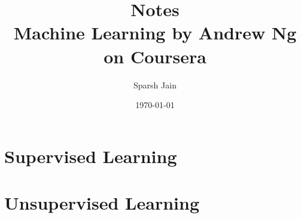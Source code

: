 \documentclass[a4paper, 12pt]{report}
\title{Notes\\
\large Machine Learning by Andrew Ng on Coursera}
\author{Sparsh Jain}
\date{\today}
\newcommand\blfootnote[1]{
	\begingroup
	\renewcommand\thefootnote{}\footnote{#1}
	\addtocounter{footnote}{-1}
	\endgroup
}
\theoremstyle{definition}
\theoremstyle{remark}
\begin{document}
\maketitle
\tableofcontents



\part{Supervised Learning}






















\part{Unsupervised Learning}



\end{document}
